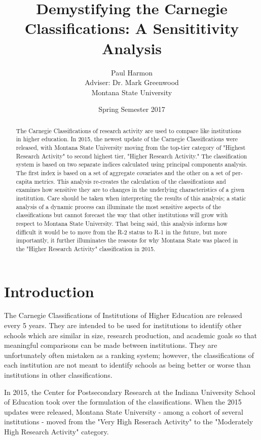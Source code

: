 \documentclass{article}\usepackage[]{graphicx}\usepackage[]{color}
\title{Demystifying the Carnegie Classifications: A Sensititivity Analysis}
\author{Paul Harmon\\ Adviser: Dr. Mark Greenwood\\Montana State University}
\date{Spring Semester 2017}
\begin{document}
\maketitle
\begin{abstract}
The Carnegie Classifications of research activity are used to compare like institutions in higher education. In 2015, the newest update of the Carnegie Classifications were released, with Montana State University moving from the top-tier category of "Highest Research Activity" to second highest tier, "Higher Research Activity."  The classification system is based on two separate indices calculated using principal components analysis. The first index is based on a set of aggregate covariates and the other on a set of per-capita metrics. 
 This analysis re-creates the calculation of the classifications and examines how sensitive they are to changes in the underlying characteristics of a given institution. Care should be taken when interpreting the results of this analysis; a static analysis of a dynamic process can illuminate the most sensitive aspects of the classifications but cannot forecast the way that other institutions will grow with respect to Montana State University. That being said, this analysis informs how difficult it would be to move from the R-2 status to R-1 in the future, but more importantly, it further illuminates the reasons for why Montana State was placed in the "Higher Research Activity" classification in 2015.

\end{abstract}

\section{Introduction}
The Carnegie Classifications of Institutions of Higher Education are released every 5 years. They are intended to be used for institutions to identify other schools which are similar in size, research production, and academic goals so that meaningful comparisons can be made between institutions. They are unfortunately often mistaken as a ranking system; however, the classifications of each institution are not meant to identify schools as being better or worse than institutions in other classifications. 

In 2015, the Center for Postsecondary Research at the Indiana University School of Education took over the formulation of the classifications. When the 2015 updates were released, Montana State University - among a cohort of several institutions - moved from the "Very High Reserach Activity" to the "Moderately High Research Activity" category. 
\end{document}
